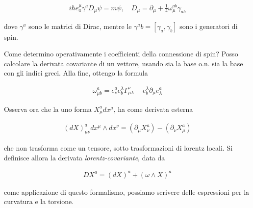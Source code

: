 \documentclass{report}
\begin{document}
\begin{align}
    i\hbar e^\mu_a \gamma^a D_\mu \psi = m \psi, \quad D_\mu = \partial_\mu + \frac{1}{4}\omega_\mu^{ab}\gamma_{ab}
\end{align}

dove \(\gamma^a\) sono le matrici di Dirac, mentre le \(\gamma^ab = [\gamma_a, \gamma_b]\) sono i generatori di spin. 

Come determino operativamente i coefficienti della connessione di spin? Posso calcolare la derivata covariante di un vettore, usando sia la base o.n. sia la base con gli indici greci. Alla fine, ottengo la formula 

\begin{align}
    \omega^a_{\mu b} = e^a_\nu e^\lambda _b \Gamma^\nu_{\mu\lambda} - e^\lambda_b \partial_\mu e^a_\lambda
\end{align}

Osserva ora che la uno forma \(X^a_\mu dx^\mu\), ha come derivata esterna 

\begin{align}
    (dX)^a_{\mu\nu}dx^\mu \wedge dx^\nu = (\partial_\mu X^a_\nu) - (\partial_\nu X^a_\mu) 
\end{align}

che non trasforma come un tensore, sotto trasformazioni di lorentz locali. Si definisce allora la derivata \emph{lorentz-covariante}, data da 

\begin{align}
    DX^a = (dX)^a + (\omega \wedge X)^a
\end{align}

come applicazione di questo formalismo, possiamo scrivere delle espressioni per la curvatura e la torsione. 
\end{document}
